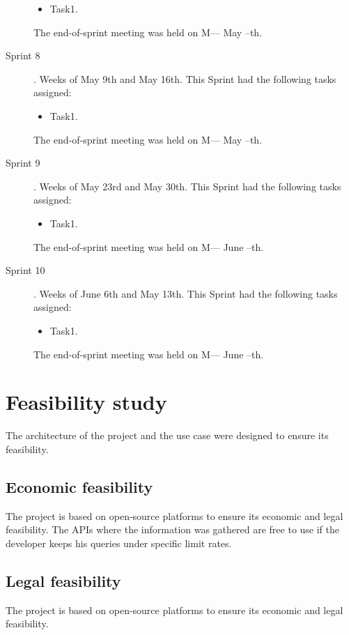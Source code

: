 \begin{description}
	\begin{itemize}
		\item Task1.
	\end{itemize}
	The end-of-sprint meeting was held on M--- May --th.
	\item[Sprint 8]. Weeks of May 9th and May 16th. This Sprint had the following tasks assigned:
	\begin{itemize}
		\item Task1.
	\end{itemize}
	The end-of-sprint meeting was held on M--- May --th.
	\item[Sprint 9]. Weeks of May 23rd and May 30th. This Sprint had the following tasks assigned:
	\begin{itemize}
		\item Task1.
	\end{itemize}
	The end-of-sprint meeting was held on M--- June --th.
	\item[Sprint 10]. Weeks of June 6th and May 13th. This Sprint had the following tasks assigned:
	\begin{itemize}
		\item Task1.
	\end{itemize}
	The end-of-sprint meeting was held on M--- June --th.
\end{description}

\section{Feasibility study}
\nonzeroparskip The architecture of the project and the use case were designed to ensure its feasibility.

\subsection{Economic feasibility}
\nonzeroparskip The project is based on open-source platforms to ensure its economic and legal feasibility. The APIs where the information was gathered are free to use if the developer keeps his queries under specific limit rates.

\subsection{Legal feasibility}
\nonzeroparskip The project is based on open-source platforms to ensure its economic and legal feasibility. 

